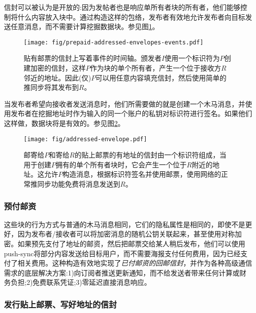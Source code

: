 信封可以被认为是开放的:因为发帖者也是响应单所有者块的所有者，他们能够控制将什么内容放入块中。通过构造这样的包络，发布者有效地允许发布者向目标发送任意消息，而不需要计算挖掘数据块。参见图\ref{fig:addressed-envelope-events}。 


\begin{figure}[htbp]
   \centering
   \texttt{[image: fig/prepaid-addressed-envelopes-events.pdf]}
   \caption[贴有邮票，写有地址的信封，事件的时间表]{贴有邮票的信封上写着事件的时间轴。颁发者$I$使用一个标识符为$P$创建加密的信封，这样$P$作为块的单个所有者，产生一个位于接收方$R$邻近的地址。因此(仅)$P$可以用任意内容填充信封，然后使用简单的推同步将其发布到$R$。}
   \label{fig:addressed-envelope-events}
\end{figure}

当发布者希望向接收者发送消息时，他们所需要做的就是创建一个木马消息，并使用发布者在挖掘地址时作为输入的同一个账户的私钥对标识符进行签名。如果他们这样做，数据块将是有效的。参见图\ref{fig:addressed-envelope}。


\begin{figure}[htbp]
   \centering
   \texttt{[image: fig/addressed-envelope.pdf]}
   \caption[贴有邮票和地址的信封\statusgreen]{邮寄给$P$和寄给$R$的贴上邮票的有地址的信封由一个标识符组成，当用于创建$P$拥有的单个所有者块时，它会产生一个位于$R$附近的地址。这允许$P$构造消息，根据标识符签名并使用邮票，使用网络的正常推同步功能免费将消息发送到$R$。 }
   \label{fig:addressed-envelope}
\end{figure}

\subsubsection{预付邮资}

这些块的行为方式与普通的木马消息相同，它们的隐私属性是相同的，即使不是更好，因为发布者/接收者可以将加密消息的随机公钥关联起来，甚至使用对称加密。如果预先支付了地址的邮资，然后把邮票交给某人稍后发布，他们可以使用push-sync将部分内容发送给目标用户，而不需要海报支付任何费用，因为已经支付了相关费用。这种构造有效地实现了\emph{已付邮资的回邮信封}，并作为各种高级通信需求的底层解决方案:1)向订阅者推送更新通知，而不给发送者带来任何计算或财务负担;2)免费联系凭证;3)零延迟直接消息响应。  


\subsubsection{发行贴上邮票、写好地址的信封}

